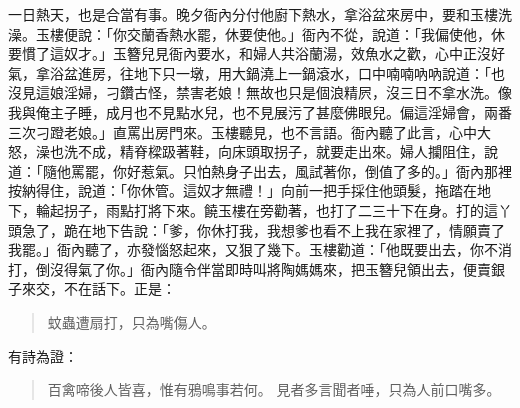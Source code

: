 一日熱天，也是合當有事。晚夕衙內分付他廚下熱水，拿浴盆來房中，要和玉樓洗澡。玉樓便說：「你交蘭香熱水罷，休要使他。」衙內不從，說道：「我偏使他，休要慣了這奴才。」玉簪兒見衙內要水，和婦人共浴蘭湯，效魚水之歡，心中正沒好氣，拿浴盆進房，往地下只一墩，用大鍋澆上一鍋滾水，口中喃喃吶吶說道：「也沒見這娘淫婦，刁鑽古怪，禁害老娘！無故也只是個浪精屄，沒三日不拿水洗。像我與俺主子睡，成月也不見點水兒，也不見展污了甚麼佛眼兒。偏這淫婦會，兩番三次刁蹬老娘。」直罵出房門來。玉樓聽見，也不言語。衙內聽了此言，心中大怒，澡也洗不成，精脊樑趿著鞋，向床頭取拐子，就要走出來。婦人攔阻住，說道：「隨他罵罷，你好惹氣。只怕熱身子出去，風試著你，倒值了多的。」衙內那裡按納得住，說道：「你休管。這奴才無禮！」向前一把手採住他頭髮，拖踏在地下，輪起拐子，雨點打將下來。饒玉樓在旁勸著，也打了二三十下在身。打的這丫頭急了，跪在地下告說：「爹，你休打我，我想爹也看不上我在家裡了，情願賣了我罷。」衙內聽了，亦發惱怒起來，又狠了幾下。玉樓勸道：「他既要出去，你不消打，倒沒得氣了你。」衙內隨令伴當即時叫將陶媽媽來，把玉簪兒領出去，便賣銀子來交，不在話下。正是：
\begin{quote}
蚊蟲遭扇打，只為嘴傷人。
\end{quote}
有詩為證：
\begin{quote}
百禽啼後人皆喜，惟有鴉鳴事若何。
見者多言聞者唾，只為人前口嘴多。
\end{quote}
